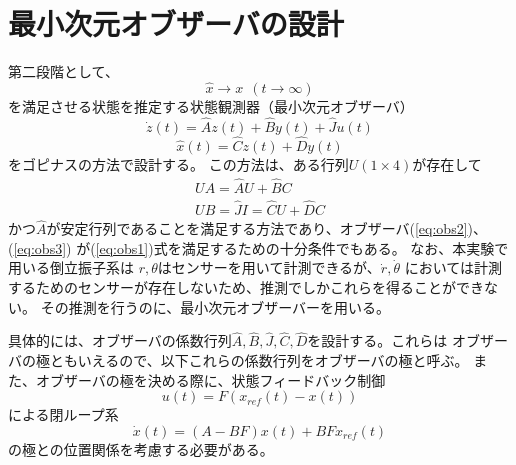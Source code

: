 \section{最小次元オブザーバの設計}
	第二段階として、
	\begin{equation}
		\hat{x}→x\ \ (t→\infty)
		\label{eq:obs1}
	\end{equation}
	を満足させる状態を推定する状態観測器（最小次元オブザーバ）
	\begin{equation}
		\dot{z}(t) = \hat{A}z(t)+\hat{B}y(t)+\hat{J}u(t)
		\label{eq:obs2}
	\end{equation}
	\begin{equation}
		\hat{x}(t) = \hat{C}z(t) + \hat{D}y(t)
		\label{eq:obs3}
	\end{equation}
	をゴピナスの方法で設計する。
	この方法は、ある行列$U(1×4)$が存在して
	\[
		\begin{array}{c}
			UA = \hat{A}U + \hat{B}C \\
			UB = \hat{J}
			I = \hat{C}U + \hat{D}C
		\end{array}
	\]
	かつ$\hat{A}$が安定行列であることを満足する方法であり、オブザーバ(\ref{eq:obs2})、(\ref{eq:obs3})
	が(\ref{eq:obs1})式を満足するための十分条件でもある。
	なお、本実験で用いる倒立振子系は
	$r,\theta$はセンサーを用いて計測できるが、$\dot{r},\dot{\theta}$
	においては計測するためのセンサーが存在しないため、推測でしかこれらを得ることができない。
	その推測を行うのに、最小次元オブザーバーを用いる。
	\par
	具体的には、オブザーバの係数行列$\hat{A},\hat{B},\hat{J},\hat{C},\hat{D}$を設計する。これらは
	オブザーバの極ともいえるので、以下これらの係数行列をオブザーバの極と呼ぶ。
	また、オブザーバの極を決める際に、状態フィードバック制御
	\[
		u(t) = F(x_{ref}(t)-x(t))
	\]
	による閉ループ系
	\[
		\dot{x}(t) = (A-BF)x(t) + BFx_{ref}(t)
	\]
	の極との位置関係を考慮する必要がある。


